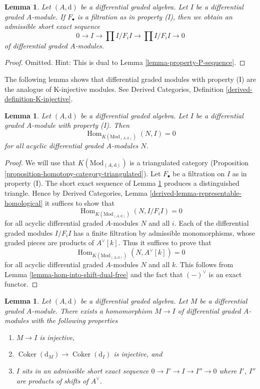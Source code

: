 \documentclass{stacks-project}
\theoremstyle{plain}
\newtheorem{lemma}[subsection]{Lemma}
\theoremstyle{definition}
\theoremstyle{remark}
\numberwithin{equation}{subsection}
\def\Hom{\mathop{\mathrm{Hom}}\nolimits}
\def\Coker{\mathop{\mathrm{Coker}}}
\begin{document}
\begin{lemma}
\label{lemma-property-I-sequence}
Let $(A, \text{d})$ be a differential graded algebra.
Let $I$ be a differential graded $A$-module. If $F_\bullet$
is a filtration as in property (I), then we obtain an
admissible short exact sequence
$$
0 \to I \to
\prod\nolimits I/F_iI \to
\prod\nolimits I/F_iI \to 0
$$
of differential graded $A$-modules.
\end{lemma}

\begin{proof}
Omitted. Hint: This is dual to Lemma \ref{lemma-property-P-sequence}.
\end{proof}

\noindent
The following lemma shows that differential graded modules with
property (I) are the analogue of K-injective modules. See
Derived Categories, Definition \ref{derived-definition-K-injective}.

\begin{lemma}
\label{lemma-property-I-K-injective}
Let $(A, \text{d})$ be a differential graded algebra.
Let $I$ be a differential graded $A$-module with property (I).
Then
$$
\Hom_{K(\text{Mod}_{(A, \text{d})})}(N, I) = 0
$$
for all acyclic differential graded $A$-modules $N$.
\end{lemma}

\begin{proof}
We will use that $K(\text{Mod}_{(A, \text{d})})$ is a triangulated
category (Proposition \ref{proposition-homotopy-category-triangulated}).
Let $F_\bullet$ be a filtration on $I$ as in property (I).
The short exact sequence of Lemma \ref{lemma-property-I-sequence}
produces a distinguished triangle. Hence by
Derived Categories, Lemma \ref{derived-lemma-representable-homological}
it suffices to show that
$$
\Hom_{K(\text{Mod}_{(A, \text{d})})}(N, I/F_iI) = 0
$$
for all acyclic differential graded $A$-modules $N$ and all $i$.
Each of the differential graded modules $I/F_iI$ has a finite filtration
by admissible monomorphisms, whose graded pieces are
products of $A^\vee[k]$. Thus it suffices to prove that
$$
\Hom_{K(\text{Mod}_{(A, \text{d})})}(N, A^\vee[k]) = 0
$$
for all acyclic differential graded $A$-modules $N$ and all $k$.
This follows from Lemma \ref{lemma-hom-into-shift-dual-free}
and the fact that $(-)^\vee$ is an exact functor.
\end{proof}

\begin{lemma}
\label{lemma-good-sub}
Let $(A, \text{d})$ be a differential graded algebra.
Let $M$ be a differential graded $A$-module. There exists a homomorphism
$M \to I$ of differential graded $A$-modules with the following
properties
\begin{enumerate}
\item $M \to I$ is injective,
\item $\Coker(\text{d}_M) \to \Coker(\text{d}_I)$ is injective,
and
\item $I$ sits in an admissible short exact sequence
$0 \to I' \to I \to I'' \to 0$ where $I'$, $I''$ are products
of shifts of $A^\vee$.
\end{enumerate}
\end{lemma}
\end{document}
